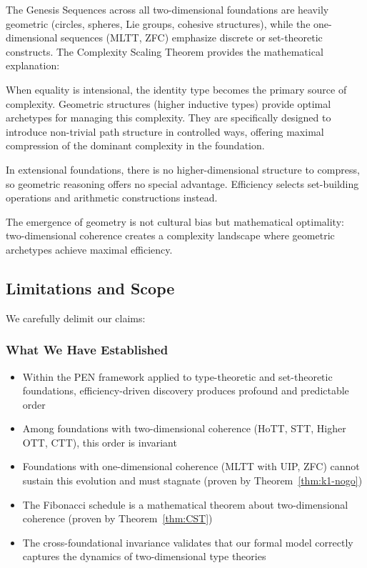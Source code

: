 \documentclass[11pt]{article}
\theoremstyle{definition}
\theoremstyle{remark}
\begin{document}
The Genesis Sequences across all two-dimensional foundations are heavily geometric (circles, spheres,
Lie groups, cohesive structures), while the one-dimensional sequences (MLTT, ZFC) emphasize
discrete or set-theoretic constructs. The Complexity Scaling Theorem provides the mathematical
explanation:

When equality is intensional, the identity type becomes the primary source of complexity. Geometric
structures (higher inductive types) provide optimal archetypes for managing this complexity. They
are specifically designed to introduce non-trivial path structure in controlled ways, offering maximal
compression of the dominant complexity in the foundation.

In extensional foundations, there is no higher-dimensional structure to compress, so geometric
reasoning offers no special advantage. Efficiency selects set-building operations and arithmetic
constructions instead.

The emergence of geometry is not cultural bias but mathematical optimality: two-dimensional
coherence creates a complexity landscape where geometric archetypes achieve maximal efficiency.

\subsection{Limitations and Scope}

We carefully delimit our claims:

\subsubsection{What We Have Established}

\begin{itemize}
\item Within the PEN framework applied to type-theoretic and set-theoretic foundations, efficiency-driven
discovery produces profound and predictable order

\item Among foundations with two-dimensional coherence (HoTT, STT, Higher OTT, CTT), this
order is invariant

\item Foundations with one-dimensional coherence (MLTT with UIP, ZFC) cannot sustain this
evolution and must stagnate (proven by Theorem~\ref{thm:k1-nogo})

\item The Fibonacci schedule is a mathematical theorem about two-dimensional coherence (proven
by Theorem~\ref{thm:CST})

\item The cross-foundational invariance validates that our formal model correctly captures the
dynamics of two-dimensional type theories
\end{itemize}
\end{document}
